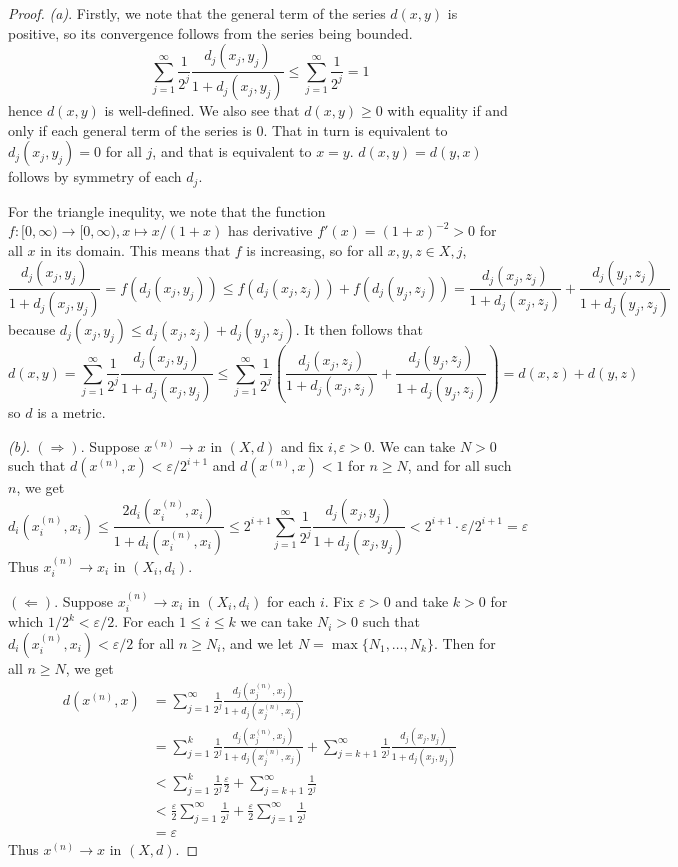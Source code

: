 \documentclass{article}
\newcommand{\longimplies}{\Longrightarrow}
\theoremstyle{definition} %
\numberwithin{thm}{section} %
\theoremstyle{definition} %
\begin{document}
\begin{proof}
\textit{(a)}. Firstly, we note that the general term of the series 
$d(x, y)$ is positive, so its convergence follows from the series being
bounded.
\[
    \sum_{j = 1}^\infty \frac{1}{2^j}\frac{d_j(x_j, y_j)}{1 + d_j(x_j, y_j)}
    \leq \sum_{j = 1}^\infty \frac{1}{2^j} = 1
\]
hence $d(x, y)$ is well-defined. We also see that $d(x, y) \geq 0$ with
equality if and only if each general term of the series is 0. That in turn
is equivalent to $d_j(x_j, y_j) = 0$ for all $j$, and that is equivalent to
$x = y$. $d(x, y) = d(y, x)$ follows by symmetry of each $d_j$.

For the triangle inequlity, we note that the function 
$f:[0, \infty) \to [0, \infty), x \mapsto x/(1 + x)$ has derivative 
$f'(x) = (1 + x)^{-2} > 0$ for all $x$ in its domain.
This means that $f$ is increasing, so for all 
$x, y, z \in X, j$,
\[
    \frac{d_j(x_j, y_j)}{1 + d_j(x_j, y_j)} = f(d_j(x_j, y_j)) \leq 
    f(d_j(x_j, z_j)) + f(d_j(y_j, z_j)) = 
    \frac{d_j(x_j, z_j)}{1 + d_j(x_j, z_j)} + 
    \frac{d_j(y_j, z_j)}{1 + d_j(y_j, z_j)}
\]
because $d_j(x_j, y_j) \leq d_j(x_j, z_j) + d_j(y_j, z_j)$. It then follows
that 
\[
    d(x, y) = \sum_{j = 1}^\infty \frac{1}{2^j}
    \frac{d_j(x_j, y_j)}{1 + d_j(x_j, y_j)} \leq 
    \sum_{j = 1}^\infty \frac{1}{2^j}
    \left(\frac{d_j(x_j, z_j)}{1 + d_j(x_j, z_j)} 
    + \frac{d_j(y_j, z_j)}{1 + d_j(y_j, z_j)}\right)
    = d(x, z) + d(y, z)
\]
so $d$ is a metric.

\textit{(b)}. $(\longimplies)$. 
Suppose $x^{(n)} \to x$ in $(X, d)$ 
and fix $i, \varepsilon > 0$. We can take $N > 0$ such that 
$d(x^{(n)}, x) < \varepsilon / 2^{i + 1}$ and $d(x^{(n)}, x) < 1$ 
for $n \geq N$, and for all such $n$, we get 
\[
    d_i(x^{(n)}_i, x_i) \leq \frac{2d_i(x^{(n)}_i, x_i)}{1 + d_i(x^{(n)}_i, x_i)}
    \leq 2^{i + 1}\sum_{j = 1}^\infty \frac{1}{2^j}
    \frac{d_j(x_j, y_j)}{1 + d_j(x_j, y_j)} 
    < 2^{i + 1} \cdot \varepsilon / 2^{i + 1} 
    = \varepsilon
\]
Thus $x_i^{(n)} \to x_i$ in $(X_i, d_i)$.

$(\Longleftarrow)$. 
Suppose $x^{(n)}_i \to x_i$ in $(X_i, d_i)$ for each $i$. 
Fix $\varepsilon > 0$ and take $k > 0$ for which $1/2^k < \varepsilon / 2$.
For each $1 \leq i \leq k$ we can take $N_i > 0$ such that 
$d_i(x^{(n)}_i, x_i) < \varepsilon / 2$ for all $n \geq N_i$, and we let 
$N = \max\{N_1, \dots, N_k\}$. Then for all $n \geq N$, we get 
\begin{align*}
    d(x^{(n)}, x)
    &= \sum_{j = 1}^\infty \frac{1}{2^j}
    \frac{d_j(x_j^{(n)}, x_j)}{1 + d_j(x_j^{(n)}, x_j)} \\
    &= \sum_{j = 1}^k \frac{1}{2^j} 
    \frac{d_j(x_j^{(n)}, x_j)}{1 + d_j(x_j^{(n)}, x_j)}
    + \sum_{j = k + 1}^\infty \frac{1}{2^j}
    \frac{d_j(x_j, y_j)}{1 + d_j(x_j, y_j)} \\
    &< \sum_{j = 1}^k \frac{1}{2^j} \frac{\varepsilon}{2}
    + \sum_{j = k + 1}^\infty \frac{1}{2^j} \\
    &< \frac{\varepsilon}{2}\sum_{j = 1}^\infty \frac{1}{2^j} 
    + \frac{\varepsilon}{2}\sum_{j = 1}^\infty \frac{1}{2^j} \\
    &= \varepsilon
\end{align*}
Thus $x^{(n)} \to x$ in $(X, d)$.


\end{proof}
\end{document}
